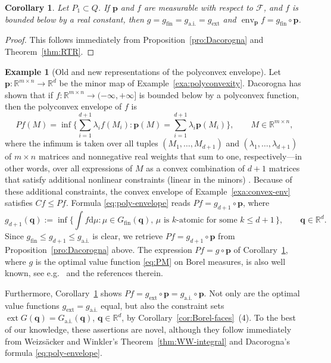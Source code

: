 \documentclass[a4paper,11pt,reqno]{amsart}
\numberwithin{equation}{section}
\theoremstyle{plain}
\newtheorem{corollary}[theorem]{Corollary}
\theoremstyle{definition}
\newtheorem{example}[theorem]{Example}
\newcommand{\bp}{\mathbf{p}}
\newcommand{\bq}{\mathbf{q}}
\newcommand{\cF}{\mathcal{F}} %
\newcommand{\dd}{\mathrm{d}} %
\newcommand{\R}{\mathbb{R}} %
\DeclareMathOperator\env{env} %
\DeclareMathOperator{\ext}{ext} %
\newcommand\ait{\mathrm{a.i.}}
\newcommand\extt{\mathrm{ext}}
\newcommand\fint{\mathrm{fin}}
\begin{document}
%
\begin{corollary}\label{cor:Dacorogna}
Let $P_1\subset Q$. If $\bp$ and $f$ are measurable with respect to $\cF$, and $f$ is bounded 
below by a real constant, then $g=g_\fint=g_\ait=g_\extt$ and $\env_\bp f=g_\fint\circ\bp$.
\end{corollary}
%
\begin{proof}
This follows immediately from Proposition~\ref{pro:Dacorogna} and Theorem~\ref{thm:RTR}.
\end{proof}
%
\begin{example}[Old and new representations of the polyconvex envelope]%
\label{exa:polyconvex-envelope}
Let $\bp\colon\R^{m\times n}\to\R^d$ be the minor map of Example~\ref{exa:polyconvexity}. 
Dacorogna has shown that if $f\colon\R^{m\times n}\to(-\infty,+\infty]$ is bounded below 
by a polyconvex function, then the polyconvex envelope of $f$ is 
\begin{equation}\label{eq:poly-envelope}\textstyle
P f(M)
=\inf\{\sum_{i=1}^{d+1}\lambda_if(M_i) : \bp(M)=\sum_{i=1}^{d+1}\lambda_i\bp(M_i)\},
\qquad M\in\R^{m\times n},
\end{equation}
where the infimum is taken over all tuples $(M_1,\ldots,M_{d+1})$ and 
$(\lambda_1,\dots,\lambda_{d+1})$ of $m\times n$ matrices and nonnegative real weights 
that sum to one, respectively---in other words, over all expressions of $M$ as a convex 
combination of $d+1$ matrices that satisfy additional nonlinear constraints (linear in 
the minors) \cite[Theorem~6.8]{dacorogna08}. Because of these additional constraints,
the convex envelope of Example~\ref{exa:convex-env} satisfies $C f\leq P f$. Formula
\eqref{eq:poly-envelope} reads $Pf=g_{d+1}\circ\bp$, where 
\begin{equation}\label{eq:gd1}\textstyle
g_{d+1}(\bq):=
\inf\{ \int f\dd\mu : \text{$\mu\in G_\fint(\bq)$, $\mu$ is $k$-atomic for some $k\leq d+1$}\,\},
\qquad \bq\in\R^d.
\end{equation}
Since $g_\fint\leq g_{d+1}\leq g_\ait$ is clear, we retrieve $Pf=g_{d+1}\circ\bp$ from 
Proposition~\ref{pro:Dacorogna} above. The expression $P f=g\circ\bp$ of 
Corollary~\ref{cor:Dacorogna}, where $g$ is the optimal value function \eqref{eq:PM} on Borel 
measures, is also well known, see e.g.\ \cite{fantuzzi-etal26} and the references therein.
\par
%
Furthermore, Corollary~\ref{cor:Dacorogna} shows $P f=g_\extt\circ\bp=g_\ait\circ\bp$. Not 
only are the optimal value functions $g_\extt=g_\ait$ equal, but also the constraint sets 
$\ext G(\bq)=G_\ait(\bq)$, $\bq\in\R^d$, by Corollary~\ref{cor:Borel-faces}~(4). To the
best of our knowledge, these assertions are novel, although they follow immediately from 
Weizs\"{a}cker and Winkler's Theorem~\ref{thm:WW-integral} and Dacorogna's formula 
\eqref{eq:poly-envelope}. 
\end{example}
\end{document}
